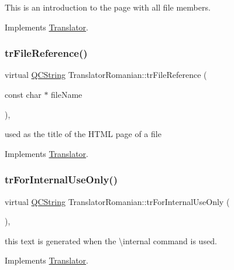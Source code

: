 This is an introduction to the page with all file members. 

Implements \mbox{\hyperlink{class_translator}{Translator}}.

\mbox{\label{class_translator_romanian_a9e1b0065dd8c0af1671de4f411953315}} 
\subsubsection{\texorpdfstring{trFileReference()}{trFileReference()}}
{\footnotesize\ttfamily virtual \mbox{\hyperlink{class_q_c_string}{Q\+C\+String}} Translator\+Romanian\+::tr\+File\+Reference (\begin{DoxyParamCaption}\item[{const char $\ast$}]{file\+Name }\end{DoxyParamCaption})\hspace{0.3cm}{\ttfamily [inline]}, {\ttfamily [virtual]}}

used as the title of the H\+T\+ML page of a file 

Implements \mbox{\hyperlink{class_translator}{Translator}}.

\mbox{\label{class_translator_romanian_ac5386326b3f293bffde9d4ad39957f57}} 
\subsubsection{\texorpdfstring{trForInternalUseOnly()}{trForInternalUseOnly()}}
{\footnotesize\ttfamily virtual \mbox{\hyperlink{class_q_c_string}{Q\+C\+String}} Translator\+Romanian\+::tr\+For\+Internal\+Use\+Only (\begin{DoxyParamCaption}{ }\end{DoxyParamCaption})\hspace{0.3cm}{\ttfamily [inline]}, {\ttfamily [virtual]}}

this text is generated when the \textbackslash{}internal command is used. 

Implements \mbox{\hyperlink{class_translator}{Translator}}.

